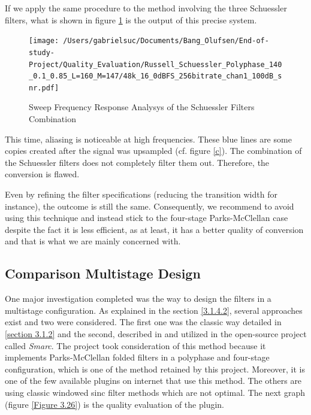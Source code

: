 If we apply the same procedure to the method involving the three Schuessler filters, what is shown in figure \ref{Figure 3.25} is the output of this precise system.

\begin{figure}[ht!]
	\centering
	\texttt{[image: /Users/gabrielsuc/Documents/Bang\_Olufsen/End-of-study-Project/Quality\_Evaluation/Russell\_Schuessler\_Polyphase\_140\_0.1\_0.85\_L=160\_M=147/48k\_16\_0dBFS\_256bitrate\_chan1\_100dB\_snr.pdf]}
	\captionsetup{width=0.98\linewidth}
	\caption{Sweep Frequency Response Analysys of the Schuessler Filters Combination}\label{Figure 3.25}
\end{figure}

This time, aliasing is noticeable at high frequencies. These blue lines are some copies created after the signal was upsampled (cf. figure \ref{c}). The combination of the Schuessler filters does not completely filter them out. Therefore, the conversion is flawed. 

Even by refining the filter specifications (reducing the transition width for instance), the outcome is still the same. Consequently, we recommend to avoid using this technique and instead stick to the four-stage Parks-McClellan case despite the fact it is less efficient, as at least, it has a better quality of conversion and that is what we are mainly concerned with. 



\subsection{Comparison Multistage Design}\label{section 3.2.6}

One major investigation completed was the way to design the filters in a multistage configuration. As explained in the section \ref{3.1.4.2}, several approaches exist and two were considered. The first one was the classic way detailed in \ref{section 3.1.2} and the second, described in \cite{paristech} and utilized in the open-source project called \textit{Smarc}. The project took consideration of this method because it implements Parks-McClellan folded filters in a polyphase and four-stage configuration, which is one of the method retained by this project. Moreover, it is one of the few available plugins on internet that use this method. The others are using classic windowed sinc filter methods which are not optimal. The next graph (figure \ref{Figure 3.26}) is the quality evaluation of the plugin. 


